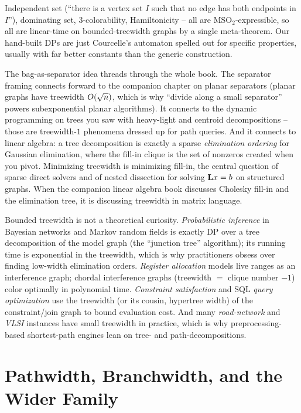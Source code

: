 Independent set (``there is a vertex set $I$ such that no edge has both endpoints
in $I$''), dominating set, $3$-colorability, Hamiltonicity -- all are
MSO$_2$-expressible, so all are linear-time on bounded-treewidth graphs by a
single meta-theorem. Our hand-built DPs are just Courcelle's automaton spelled out
for specific properties, usually with far better constants than the generic
construction.

\begin{connectionbox}
The bag-as-separator idea threads through the whole book. The separator framing
connects forward to the companion chapter on planar separators (planar graphs have
treewidth $O(\sqrt n)$, which is why ``divide along a small separator'' powers
subexponential planar algorithms). It connects to the dynamic programming on trees
you saw with heavy-light and centroid decompositions -- those are treewidth-$1$
phenomena dressed up for path queries. And it connects to linear algebra: a tree
decomposition is exactly a sparse \emph{elimination ordering} for Gaussian
elimination, where the fill-in clique is the set of nonzeros created when you
pivot. Minimizing treewidth is minimizing fill-in, the central question of sparse
direct solvers and of nested dissection for solving $\mathbf{L} x=b$ on structured
graphs. When the companion linear algebra book discusses Cholesky fill-in and the
elimination tree, it is discussing treewidth in matrix language.
\end{connectionbox}

\begin{applicationbox}
Bounded treewidth is not a theoretical curiosity. \emph{Probabilistic inference}
in Bayesian networks and Markov random fields is exactly DP over a tree
decomposition of the model graph (the ``junction tree'' algorithm); its running
time is exponential in the treewidth, which is why practitioners obsess over
finding low-width elimination orders. \emph{Register allocation} models live
ranges as an interference graph; chordal interference graphs (treewidth $=$ clique
number $-1$) color optimally in polynomial time. \emph{Constraint satisfaction}
and SQL \emph{query optimization} use the treewidth (or its cousin, hypertree
width) of the constraint/join graph to bound evaluation cost. And many
\emph{road-network} and \emph{VLSI} instances have small treewidth in practice,
which is why preprocessing-based shortest-path engines lean on tree- and
path-decompositions.
\end{applicationbox}

\section{Pathwidth, Branchwidth, and the Wider Family}
\label{ch24:family}

